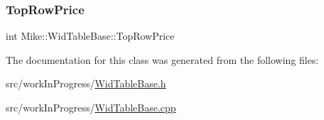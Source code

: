 \subsubsection{\texorpdfstring{Top\+Row\+Price}{TopRowPrice}}
{\footnotesize\ttfamily int Mike\+::\+Wid\+Table\+Base\+::\+Top\+Row\+Price\hspace{0.3cm}{\ttfamily [protected]}}



The documentation for this class was generated from the following files\+:\begin{DoxyCompactItemize}
\item 
src/work\+In\+Progress/\hyperlink{_wid_table_base_8h}{Wid\+Table\+Base.\+h}\item 
src/work\+In\+Progress/\hyperlink{_wid_table_base_8cpp}{Wid\+Table\+Base.\+cpp}\end{DoxyCompactItemize}
